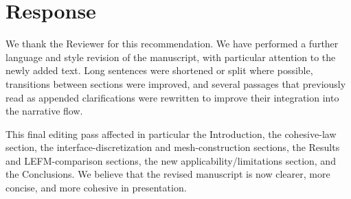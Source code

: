 \documentclass[12pt,a4paper]{article}
\begin{document}
	\section*{Response}
	
	\begin{tcolorbox}[authorbox]
		We thank the Reviewer for this recommendation. We have performed a further language and style revision of the manuscript, with particular attention to the newly added text. Long sentences were shortened or split where possible, transitions between sections were improved, and several passages that previously read as appended clarifications were rewritten to improve their integration into the narrative flow.
		
		This final editing pass affected in particular the Introduction, the cohesive-law section, the interface-discretization and mesh-construction sections, the Results and LEFM-comparison sections, the new applicability/limitations section, and the Conclusions. We believe that the revised manuscript is now clearer, more concise, and more cohesive in presentation.
	\end{tcolorbox}
\end{document}
